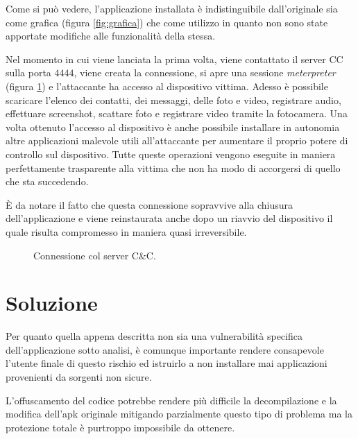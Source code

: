 Come si può vedere, l'applicazione installata è indistinguibile dall'originale sia come grafica (figura \ref{fig:grafica}) che come utilizzo in quanto non sono state apportate modifiche alle funzionalità della stessa. 

Nel momento in cui viene lanciata la prima volta, viene contattato il server \ac{CC} sulla porta $4444$, viene creata la connessione, si apre una sessione \emph{meterpreter} (figura \ref{fig:meterpreter}) e l'attaccante ha accesso al dispositivo vittima. Adesso è possibile scaricare l'elenco dei contatti, dei messaggi, delle foto e video, registrare audio, effettuare screenshot, scattare foto e registrare video tramite la fotocamera. Una volta ottenuto l'accesso al dispositivo è anche possibile installare in autonomia altre applicazioni malevole utili all'attaccante per aumentare il proprio potere di controllo sul dispositivo. Tutte queste operazioni vengono eseguite in maniera perfettamente trasparente alla vittima che non ha modo di accorgersi di quello che sta succedendo. 

È da notare il fatto che questa connessione sopravvive alla chiusura dell'applicazione e viene reinstaurata anche dopo un riavvio del dispositivo il quale risulta compromesso in maniera quasi irreversibile.

\begin{figure}[h]
	\centering
	\caption{Connessione col server C\&C.}
	\label{fig:meterpreter} 
\end{figure}

\section{Soluzione}

Per quanto quella appena descritta non sia una vulnerabilità specifica dell'applicazione sotto analisi, è comunque importante rendere consapevole l'utente finale di questo rischio ed istruirlo a non installare mai applicazioni provenienti da sorgenti non sicure.

L'offuscamento del codice potrebbe rendere più difficile la decompilazione e la modifica dell'apk originale mitigando parzialmente questo tipo di problema ma la protezione totale è purtroppo impossibile da ottenere.